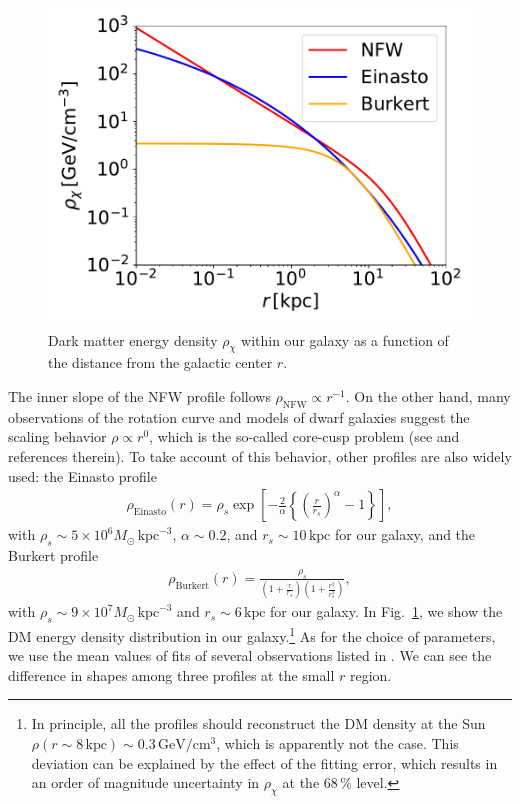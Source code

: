 \documentclass[12pt,twoside,book]{article}
\begin{document}
\begin{figure}
  \centering
  \includegraphics[width=0.5\hsize]{profile.pdf}
  \caption{
    Dark matter energy density $\rho_\chi$ within our galaxy as a function of the distance from the galactic center $r$.
  }
  \label{fig:profile}
\end{figure}

The inner slope of the NFW profile follows $\rho_{\mathrm{NFW}} \propto r^{-1}$.
On the other hand, many observations of the rotation curve and models of dwarf galaxies suggest the scaling behavior $\rho \propto r^0$, which is the so-called core-cusp problem (see \cite{Genina_2017} and references therein).
To take account of this behavior, other profiles are also widely used: the Einasto profile \cite{1965TrAlm...5...87E, Graham:2005xx}
\begin{align}
  \rho_{\mathrm{Einasto}} (r) = \rho_s \exp \left[
  -\frac{2}{\alpha} \left\{ \left( \frac{r}{r_s} \right)^\alpha - 1 \right\} \right],
\end{align}
with $\rho_s \sim 5 \times 10^6 M_\odot\, \mathrm{kpc}^{-3}$, $\alpha \sim 0.2$, and $r_s \sim 10\,\mathrm{kpc}$ for our galaxy, and the Burkert profile \cite{Burkert:1995yz}
\begin{align}
  \rho_{\mathrm{Burkert}} (r) = \frac{\rho_s}
  {\left( 1 + \frac{r}{r_s} \right) \left( 1 + \frac{r^2}{r_s^2} \right)},
\end{align}
with $\rho_s \sim 9 \times 10^7 M_\odot\, \mathrm{kpc}^{-3}$ and $r_s \sim 6\, \mathrm{kpc}$ for our galaxy.
In Fig.~\ref{fig:profile}, we show the DM energy density distribution in our galaxy.\footnote{
  In principle, all the profiles should reconstruct the DM density at the Sun $\rho (r \sim 8\, \mathrm{kpc}) \sim 0.3\, \mathrm{GeV} / \mathrm{cm}^3$, which is apparently not the case.
  This deviation can be explained by the effect of the fitting error, which results in an order of magnitude uncertainty in $\rho_\chi$ at the $68\,\%$ level.
}
As for the choice of parameters, we use the mean values of fits of several observations listed in \cite{Fornasa:2013iaa}.
We can see the difference in shapes among three profiles at the small $r$ region.
\end{document}
